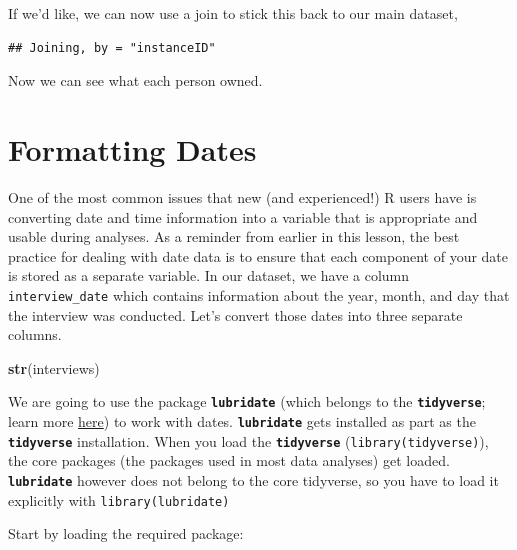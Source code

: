 \documentclass[]{book}
\newenvironment{Shaded}{\begin{snugshade}}{\end{snugshade}}
\newcommand{\KeywordTok}[1]{\textcolor[rgb]{0.13,0.29,0.53}{\textbf{#1}}}
\newcommand{\StringTok}[1]{\textcolor[rgb]{0.31,0.60,0.02}{#1}}
\newcommand{\OperatorTok}[1]{\textcolor[rgb]{0.81,0.36,0.00}{\textbf{#1}}}
\newcommand{\NormalTok}[1]{#1}
\begin{document}
If we'd like, we can now use a join to stick this back to our main
dataset,

\begin{Shaded}
\end{Shaded}

\begin{verbatim}
## Joining, by = "instanceID"
\end{verbatim}

Now we can see what each person owned.

\section{Formatting Dates}\label{formatting-dates}

One of the most common issues that new (and experienced!) R users have
is converting date and time information into a variable that is
appropriate and usable during analyses. As a reminder from earlier in
this lesson, the best practice for dealing with date data is to ensure
that each component of your date is stored as a separate variable. In
our dataset, we have a column \texttt{interview\_date} which contains
information about the year, month, and day that the interview was
conducted. Let's convert those dates into three separate columns.

\begin{Shaded}
\begin{Highlighting}[]
\KeywordTok{str}\NormalTok{(interviews)}
\end{Highlighting}
\end{Shaded}

We are going to use the package \textbf{\texttt{lubridate}} (which
belongs to the \textbf{\texttt{tidyverse}}; learn more
\href{https://www.tidyverse.org/}{here}) to work with dates.
\textbf{\texttt{lubridate}} gets installed as part as the
\textbf{\texttt{tidyverse}} installation. When you load the
\textbf{\texttt{tidyverse}} (\texttt{library(tidyverse)}), the core
packages (the packages used in most data analyses) get loaded.
\textbf{\texttt{lubridate}} however does not belong to the core
tidyverse, so you have to load it explicitly with
\texttt{library(lubridate)}

Start by loading the required package:
\end{document}
